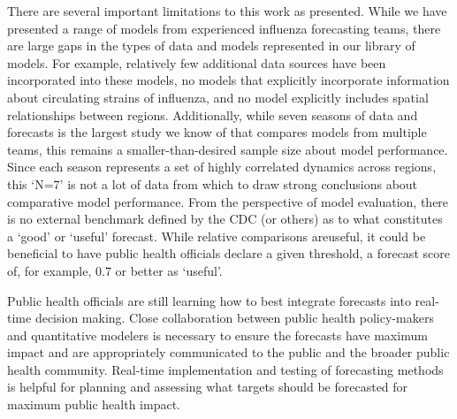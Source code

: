 \documentclass{article}\usepackage[]{graphicx}\usepackage[]{color}
\begin{document}
There are several important limitations to this work as presented.
While we have presented a range of models from experienced influenza forecasting teams, there are large gaps in the types of data and models represented in our library of models.
For example, relatively few additional data sources have been incorporated into these models, no models that explicitly incorporate information about circulating strains of influenza, and no model explicitly includes spatial relationships between regions.
Additionally, while seven seasons of data and forecasts is the largest study we know of that compares models from multiple teams, this remains a smaller-than-desired sample size about model performance. 
Since each season represents a set of highly correlated dynamics across regions, this `N=7' is not a lot of data from which to draw strong conclusions about comparative model performance.
From the perspective of model evaluation, there is no external benchmark defined by the CDC (or others) as to what constitutes a `good' or `useful' forecast. 
While relative comparisons areuseful, it could be beneficial to have public health officials declare a given threshold, a forecast score of, for example, 0.7 or better as `useful'.

Public health officials are still learning how to best integrate forecasts into real-time decision making.
Close collaboration between public health policy-makers and quantitative modelers is necessary to ensure the forecasts have maximum impact and are appropriately communicated to the public and the broader public health community. 
Real-time implementation and testing of forecasting methods is helpful for planning and assessing what targets should be forecasted for maximum public health impact.



\end{document}
